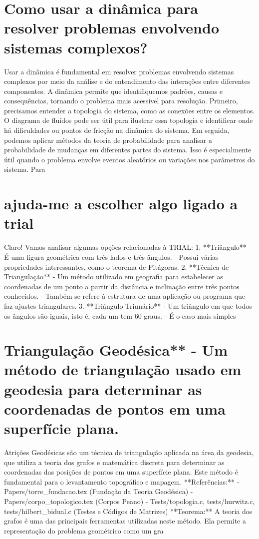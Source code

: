 \documentclass[11pt,a4paper]{article}
\begin{document}
\section{Como usar a dinâmica para resolver problemas envolvendo sistemas complexos?}
Usar a dinâmica é fundamental em resolver problemas envolvendo sistemas complexos por meio da análise e do entendimento das interações entre diferentes componentes. A dinâmica permite que identifiquemos padrões, causas e consequências, tornando o problema mais acessível para resolução. Primeiro, precisamos entender a topologia do sistema, como as conexões entre os elementos. O diagrama de fluídos pode ser útil para ilustrar essa topologia e identificar onde há dificuldades ou pontos de fricção na dinâmica do sistema. Em seguida, podemos aplicar métodos da teoria de probabilidade para analisar a probabilidade de mudanças em diferentes partes do sistema. Isso é especialmente útil quando o problema envolve eventos aleatórios ou variações nos parâmetros do sistema. Para

\section{ajuda-me a escolher algo ligado a trial}
Claro! Vamos analisar algumas opções relacionadas à TRIAL: 1. **Triângulo** - É uma figura geométrica com três lados e três ângulos. - Possui várias propriedades interessantes, como o teorema de Pitágoras. 2. **Técnica de Triangulação** - Um método utilizado em geografia para estabelecer as coordenadas de um ponto a partir da distância e inclinação entre três pontos conhecidos. - Também se refere à estrutura de uma aplicação ou programa que faz ajustes triangulares. 3. **Triângulo Triunário** - Um triângulo em que todos os ângulos são iguais, isto é, cada um tem 60 graus. - É o caso mais simples

\section{Triangulação Geodésica** - Um método de triangulação usado em geodesia para determinar as coordenadas de pontos em uma superfície plana.}
Atrições Geodésicas são um técnica de triangulação aplicada na área da geodesia, que utiliza a teoria dos grafos e matemática discreta para determinar as coordenadas das posições de pontos em uma superfície plana. Este método é fundamental para o levantamento topográfico e mapagem. **Referências:** - Papers/torre\_fundacao.tex (Fundação da Teoria Geodésica) - Papers/corpo\_topologico.tex (Corpos Peano) - Tests/topologia.c, tests/hurwitz.c, tests/hilbert\_bidual.c (Testes e Códigos de Matrizes) **Teorema:** A teoria dos grafos é uma das principais ferramentas utilizadas neste método. Ela permite a representação do problema geométrico como um gra
\end{document}
